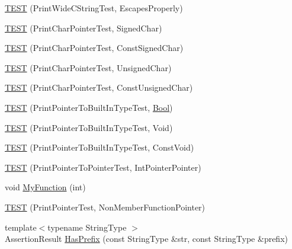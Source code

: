 \begin{DoxyCompactItemize}
\item 
\mbox{\hyperlink{namespacetesting_1_1gtest__printers__test_aa80d6bb47e6bf997dacf0c75322d12cf}{T\+E\+ST}} (Print\+Wide\+C\+String\+Test, Escapes\+Properly)
\item 
\mbox{\hyperlink{namespacetesting_1_1gtest__printers__test_acd7a56709621a91dca669023d192bdc7}{T\+E\+ST}} (Print\+Char\+Pointer\+Test, Signed\+Char)
\item 
\mbox{\hyperlink{namespacetesting_1_1gtest__printers__test_ae854b0ca4d06ffc273c391f262884681}{T\+E\+ST}} (Print\+Char\+Pointer\+Test, Const\+Signed\+Char)
\item 
\mbox{\hyperlink{namespacetesting_1_1gtest__printers__test_afb9a6a26323b287b7666b6adb5bdb149}{T\+E\+ST}} (Print\+Char\+Pointer\+Test, Unsigned\+Char)
\item 
\mbox{\hyperlink{namespacetesting_1_1gtest__printers__test_aa0487f8fd5052f7d6afe2b18ad7931f9}{T\+E\+ST}} (Print\+Char\+Pointer\+Test, Const\+Unsigned\+Char)
\item 
\mbox{\hyperlink{namespacetesting_1_1gtest__printers__test_ad08dcd672b1e66a802a564eb974c400a}{T\+E\+ST}} (Print\+Pointer\+To\+Built\+In\+Type\+Test, \mbox{\hyperlink{structBool}{Bool}})
\item 
\mbox{\hyperlink{namespacetesting_1_1gtest__printers__test_ac6d8b84db9386b399eb431b5b1668e87}{T\+E\+ST}} (Print\+Pointer\+To\+Built\+In\+Type\+Test, Void)
\item 
\mbox{\hyperlink{namespacetesting_1_1gtest__printers__test_a8819fb42392faae72e8bc594d498085d}{T\+E\+ST}} (Print\+Pointer\+To\+Built\+In\+Type\+Test, Const\+Void)
\item 
\mbox{\hyperlink{namespacetesting_1_1gtest__printers__test_afee54807b15b623718c62008bd743d4b}{T\+E\+ST}} (Print\+Pointer\+To\+Pointer\+Test, Int\+Pointer\+Pointer)
\item 
void \mbox{\hyperlink{namespacetesting_1_1gtest__printers__test_adf0e590d6776ecb7095a989ff2272d7b}{My\+Function}} (int)
\item 
\mbox{\hyperlink{namespacetesting_1_1gtest__printers__test_aa3cb60cf6f3a4a0cd7d9873cd597ffd8}{T\+E\+ST}} (Print\+Pointer\+Test, Non\+Member\+Function\+Pointer)
\item 
{\footnotesize template$<$typename String\+Type $>$ }\\Assertion\+Result \mbox{\hyperlink{namespacetesting_1_1gtest__printers__test_abbd436200da6c80944c8a7504fb56ea1}{Has\+Prefix}} (const String\+Type \&str, const String\+Type \&prefix)
\item 

\end{DoxyCompactItemize}
